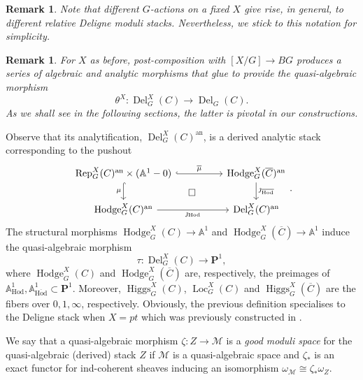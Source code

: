 \documentclass[11pt, a4paper]{amsart}
\numberwithin{equation}{section}
\newtheorem{remark}[theorem]{Remark}
\theoremstyle{definition}
\theoremstyle{remark}
\DeclareMathOperator{\Higgs}{Higgs}
\DeclareMathOperator{\an}{an}
\DeclareMathOperator{\Loc}{Loc}
\DeclareMathOperator{\Rep}{Rep}
\DeclareMathOperator{\Hodge}{Hodge}
\DeclareMathOperator{\Deligne}{Del}
\DeclareMathOperator{\Hod}{Hod}
\DeclareMathOperator{\Del}{Del}
\newcommand{\Mm}{\mathcal{M}}
\renewcommand{\P}{\mathbf{P}}
\newcommand{\ol}[1]{\overline{#1}}
\renewcommand{\AA}{\mathbb{A}}
\renewcommand{\to}{\longrightarrow}
\begin{document}
\begin{remark}
Note that different $G$-actions on a fixed $X$ give rise, in general, to different relative Deligne moduli stacks. Nevertheless, we stick to this notation for simplicity. 
\end{remark}

\begin{remark} \label{rm pivotal morphism}
For $X$ as before, post-composition with $[X/G] \to BG$ produces a series of algebraic and analytic morphisms that glue to provide the quasi-algebraic morphism
\begin{equation} \label{eq pivotal morphism}
\theta^X : \Del^X_G(C) \to \Del_G(C).
\end{equation}
As we shall see in the following sections, the latter is pivotal in our constructions.
\end{remark}



Observe that its analytification, $\Deligne_{G}^{X}(C)^{\an}$, is a derived analytic stack corresponding to the pushout
\begin{equation}
\label{eq define glu}
\begin{tikzcd}[column sep = huge]
\Rep_{G}^{X}(C)^{\an} \times (\AA^1 - 0)
& \Hodge_{G}^{X}(\ol{C})^{\an}    
\\
\Hodge_{G}^{X}(C)^{\an}  &
\Deligne_{G}^{X}(C)^{\an}
%
\arrow[from = 1-1, to = 2-2, phantom, "\square"] 
\arrow[from = 1-1, to = 1-2, "\ol{\mu}", hook] 
\arrow[from = 1-1, to = 2-1, "\mu"', hook] 
\arrow[from = 1-2, to = 2-2, "\jmath_{\ol{\Hod}}"]
\arrow[from = 2-1, to = 2-2, "\jmath_{\Hod}"']
\end{tikzcd}.
\end{equation}
The structural morphisms $\Hodge_{G}^{X}(C) \to \AA^1$ and $\Hodge_{G}^{X}(\ol C) \to \AA^1$ induce the quasi-algebraic morphism
\begin{equation}
\label{eq define tau}
\tau : \Deligne_G^X(C) \to \P^1,
\end{equation}
where $\Hodge_{G}^{X}(C)$ and $\Hodge_{G}^{X}(\ol{C})$ are, respectively, the preimages of $\AA^1_{\Hod}, \AA^1_{\ol\Hod} \subset \P^1$. Moreover, $\Higgs_{G}^{X}(C)$, $\Loc_{G}^{X}(C)$ and $\Higgs_{G}^{X}(\ol C)$ are the fibers over $0, 1,\infty$, respectively. Obviously, the previous definition specialises to the Deligne stack when $X = pt$ which was previously constructed in \cite{franco&hanson}.




We say that a quasi-algebraic morphism $\zeta : Z \to \Mm$ is a {\it good moduli space} for the quasi-algebraic (derived) stack $Z$ if $\Mm$ is a quasi-algebraic space and $\zeta_*$ is an exact functor for ind-coherent sheaves inducing an isomorphism $\omega_{\Mm} \cong \zeta_*\omega_Z$. 
\end{document}
